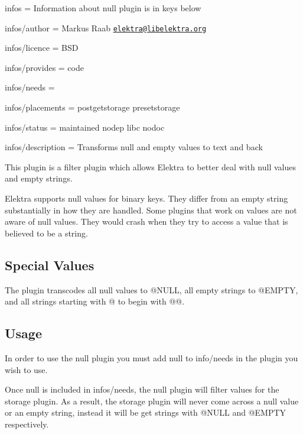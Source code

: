 
\begin{DoxyItemize}
\item infos = Information about null plugin is in keys below
\item infos/author = Markus Raab \href{mailto:elektra@libelektra.org}{\tt elektra@libelektra.\+org}
\item infos/licence = B\+S\+D
\item infos/provides = code
\item infos/needs =
\item infos/placements = postgetstorage presetstorage
\item infos/status = maintained nodep libc nodoc
\item infos/description = Transforms null and empty values to text and back
\end{DoxyItemize}

This plugin is a filter plugin which allows Elektra to better deal with null values and empty strings.

Elektra supports null values for binary keys. They differ from an empty string substantially in how they are handled. Some plugins that work on values are not aware of null values. They would crash when they try to access a value that is believed to be a string.

\subsection*{Special Values}

The plugin transcodes all null values to {\ttfamily @N\+U\+L\+L}, all empty strings to {\ttfamily @E\+M\+P\+T\+Y}, and all strings starting with {\ttfamily @} to begin with {\ttfamily @@}.

\subsection*{Usage}

In order to use the {\ttfamily null} plugin you must add {\ttfamily null} to {\ttfamily info/needs} in the plugin you wish to use.

Once {\ttfamily null} is included in {\ttfamily infos/needs}, the null plugin will filter values for the storage plugin. As a result, the storage plugin will never come across a null value or an empty string, instead it will be get strings with {\ttfamily @N\+U\+L\+L} and {\ttfamily @E\+M\+P\+T\+Y} respectively. 